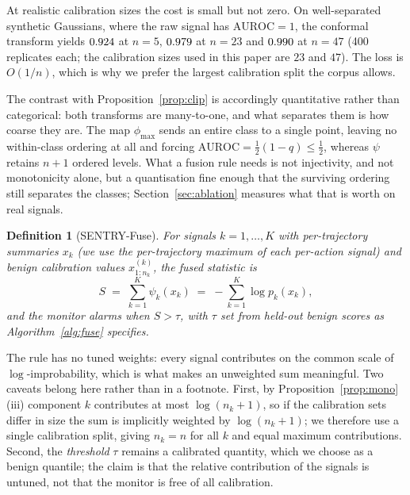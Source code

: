 \documentclass[pdflatex,sn-basic]{sn-jnl}%
\theoremstyle{thmstyleone}
\theoremstyle{thmstyletwo}
\theoremstyle{thmstylethree}
\newtheorem{definition}{Definition}
\begin{document}
At realistic calibration sizes the cost is small but not zero. On well-separated
synthetic Gaussians, where the raw signal has $\mathrm{AUROC} = 1$, the conformal
transform yields $0.924$ at $n=5$, $0.979$ at $n=23$ and
$0.990$ at $n=47$ (400 replicates each; the calibration sizes used in this paper
are $23$ and $47$). The loss is $O(1/n)$, which is why we prefer the largest
calibration split the corpus allows.

The contrast with Proposition~\ref{prop:clip} is accordingly quantitative rather
than categorical: both transforms are many-to-one, and what separates them is how
coarse they are. The map $\phi_{\max}$ sends an entire class to a single point, leaving no
within-class ordering at all and forcing
$\mathrm{AUROC} = \tfrac{1}{2}(1-q) \le \tfrac{1}{2}$, whereas $\psi$ retains
$n+1$ ordered levels. What a fusion rule needs is not injectivity, and not
monotonicity alone, but a quantisation fine enough that the surviving ordering
still separates the classes; Section~\ref{sec:ablation} measures what that is
worth on real signals.

\begin{definition}[SENTRY-Fuse]
For signals $k = 1,\dots,K$ with per-trajectory summaries $x_k$ (we use the
per-trajectory maximum of each per-action signal) and benign calibration values
$x^{(k)}_{1:n_k}$, the fused statistic is
\begin{equation}\label{eq:fuse}
S \;=\; \sum_{k=1}^{K} \psi_k(x_k) \;=\; -\sum_{k=1}^{K} \log p_k(x_k),
\end{equation}
and the monitor alarms when $S > \tau$, with $\tau$ set from held-out benign scores
as Algorithm~\ref{alg:fuse} specifies.
\end{definition}

The rule has no tuned weights: every signal contributes on the common scale of
$\log$-improbability, which is what makes an unweighted sum meaningful. Two
caveats belong here rather than in a footnote. First, by
Proposition~\ref{prop:mono}(iii) component $k$ contributes at most
$\log(n_k{+}1)$, so if the calibration sets differ in size the sum is implicitly
weighted by $\log(n_k{+}1)$; we therefore use a single calibration split, giving
$n_k = n$ for all $k$ and equal maximum contributions. Second, the
\emph{threshold} $\tau$ remains a calibrated quantity, which we choose as a
benign quantile; the claim is that the relative contribution of the signals is
untuned, not that the monitor is free of all calibration.
\end{document}
